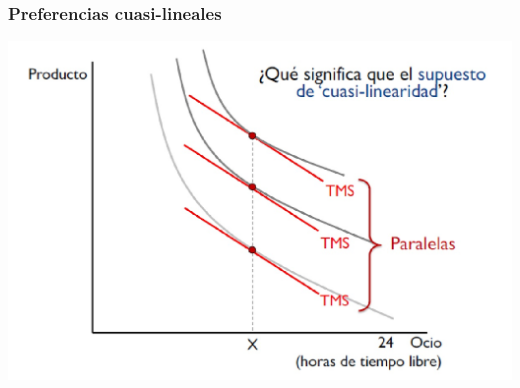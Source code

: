 \documentclass{beamer}
\begin{document}
\begin{frame}
\frametitle{Preferencias cuasi-lineales}
\centering
\includegraphics[scale=0.3]{Slides Principios de Economia/Figures/Tema_04.5_prefcuasilin.jpg}
\end{frame}
\end{document}
